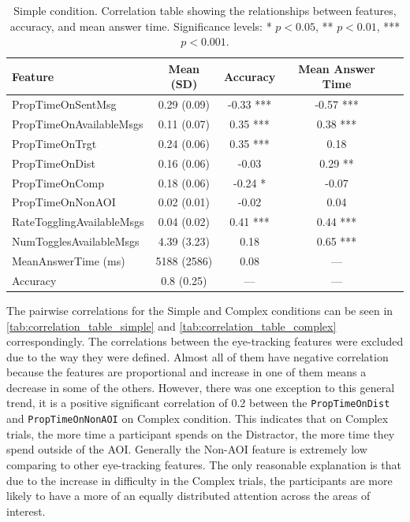 \begin{table}[h!]
\centering
\begin{tabular}{|l|c|c|c|c|}
\hline
\textbf{Feature} & \textbf{Mean (SD)} & \textbf{Accuracy} & \textbf{Mean Answer Time} \\ \hline
PropTimeOnSentMsg & 0.29 (0.09) & -0.33 *** & -0.57 *** \\ \hline
PropTimeOnAvailableMsgs & 0.11 (0.07) & 0.35 *** & 0.38 *** \\ \hline
PropTimeOnTrgt & 0.24 (0.06) & 0.35 *** & 0.18 \\ \hline
PropTimeOnDist & 0.16 (0.06) & -0.03 & 0.29 ** \\ \hline
PropTimeOnComp & 0.18 (0.06) & -0.24 * & -0.07 \\ \hline
PropTimeOnNonAOI & 0.02 (0.01) & -0.02 & 0.04 \\ \hline
RateTogglingAvailableMsgs & 0.04 (0.02) & 0.41 *** & 0.44 *** \\ \hline
NumTogglesAvailableMsgs & 4.39 (3.23) & 0.18 & 0.65 *** \\ \hline
MeanAnswerTime (ms) & 5188 (2586) & 0.08 & --- \\ \hline
Accuracy & 0.8 (0.25) & --- & --- \\ \hline
\end{tabular}
\caption{Simple condition. Correlation table showing the relationships between features, accuracy, and mean answer time. Significance levels: * $p < 0.05$, ** $p < 0.01$, *** $p < 0.001$.}
\label{tab:correlation_table_simple}
\end{table}

The pairwise correlations for the Simple and Complex conditions can be seen in \autoref{tab:correlation_table_simple} and \autoref{tab:correlation_table_complex} correspondingly. The correlations between the eye-tracking features were excluded due to the way they were defined. Almost all of them have negative correlation because the features are proportional and increase in one of them means a decrease in some of the others. However, there was one exception to this general trend, it is a positive significant correlation of 0.2 between the \texttt{PropTimeOnDist} and \texttt{PropTimeOnNonAOI} on Complex condition. This indicates that on Complex trials, the more time a participant spends on the Distractor, the more time they spend outside of the AOI. Generally the Non-AOI feature is extremely low comparing to other eye-tracking features. The only reasonable explanation is that due to the increase in difficulty in the Complex trials, the participants are more likely to have a more of an equally distributed attention across the areas of interest.

